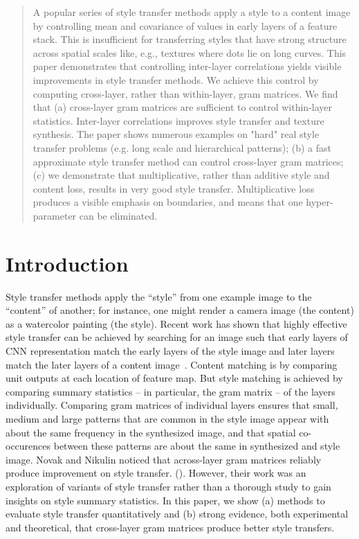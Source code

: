 \documentclass[runningheads]{llncs}
\begin{document}
\begin{abstract}
A popular series of style transfer methods apply a style to a content image by controlling mean and covariance of values in early layers of a feature stack. This is insufficient for transferring styles that have strong structure across spatial scales like, e.g., textures where dots lie on long curves. This paper demonstrates that controlling inter-layer correlations yields visible improvements in style transfer methods.  We achieve this control by computing cross-layer, rather than within-layer, gram matrices. We find that (a) cross-layer gram matrices are sufficient to control within-layer statistics. Inter-layer correlations improves style transfer and texture synthesis. The paper shows numerous examples on "hard" real style transfer problems (e.g. long scale and hierarchical patterns); (b) a fast approximate style transfer method can control cross-layer gram matrices; (c) we demonstrate that multiplicative, rather than additive style and content loss, results in very good style transfer. Multiplicative loss produces a visible emphasis on boundaries, and means that one hyper-parameter can be eliminated.   
\end{abstract}




\section{Introduction}

Style transfer methods apply the ``style'' from one example image to the ``content'' of another; for instance, one might render a camera image (the content) as a watercolor painting (the style). Recent work has shown that highly effective style transfer can be achieved by searching for an image such that early layers of CNN representation match  
the early layers of the style image and later layers match the later
layers of a content image~\cite{gatys2016image}. Content matching is
by comparing unit outputs at each location of feature map. But style
matching is achieved by comparing summary statistics -- in particular,
the gram matrix -- of the layers individually. Comparing gram matrices
of individual layers ensures that small, medium and large patterns
that are common in the style image appear with about the same
frequency in the synthesized image, and that spatial co-occurences
between these patterns are about the same in synthesized and style
image.  Novak and Nikulin noticed that across-layer gram matrices reliably produce improvement on style
transfer. (\cite{novak2016improving}). However, their work was an exploration of variants of style transfer rather than
a thorough study to gain insights on style summary statistics.   In this paper, we show (a) methods to evaluate style
transfer quantitatively and (b) strong evidence, both experimental and theoretical, that cross-layer gram matrices
produce better style transfers.
\end{document}
